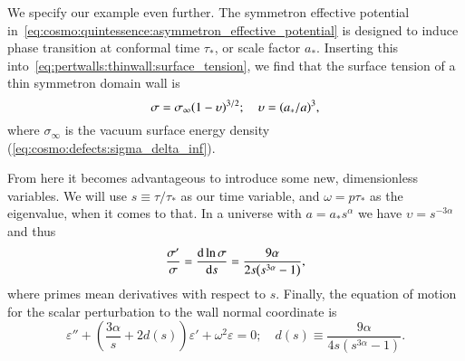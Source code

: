 


\newcommand{\eqregimenum}[1]{{\tiny{\textsf{\textbf{(#1)}}}}}



We specify our example even further. The symmetron effective potential in~\cref{eq:cosmo:quintessence:asymmetron_effective_potential} is designed to induce phase transition at conformal time $\tau_\ast$, or scale factor $a_\ast$. Inserting this into~\cref{eq:pertwalls:thinwall:surface_tension}, we find that the surface tension of a thin symmetron domain wall is
\begin{equation}
    \sigma = \sigma_\infty {\left( 1 -\upsilon  \right)}^{3/2}; \quad \upsilon={\left( a_\ast/a \right)}^3,
\end{equation}
where $\sigma_\infty$ is the vacuum surface energy density (\cref{eq:cosmo:defects:sigma_delta_inf}). 

From here it becomes advantageous to introduce some new, dimensionless variables. %
We will use $s\equiv \tau/\tau_\ast$ as our time variable, and $\omega=p\tau_\ast$ as the eigenvalue, when it comes to that. In a universe with $a = a_\ast s^\alpha$ we have $\upsilon = s^{-3\alpha}$ and thus  %
\begin{equation}
    \frac{\sigma '}{\sigma} 
    = \dv{\ln{\sigma}}{s} = \frac{9\alpha}{2s{\left( s^{3\alpha} -1  \right)}},
\end{equation}
where primes mean derivatives with respect to $s$. %
Finally, the equation of motion for the scalar perturbation to the wall normal coordinate is
\begin{equation}\label{eq:pertwalls:untitled1:eom_final}
    \varepsilon'' + \left(  \frac{3\alpha}{s}  + 2 d(s)\right)\varepsilon' + \omega^2\varepsilon = 0; \quad d(s)\equiv \frac{9\alpha}{4 s \left( s^{3\alpha}-1 \right)}.
\end{equation}



